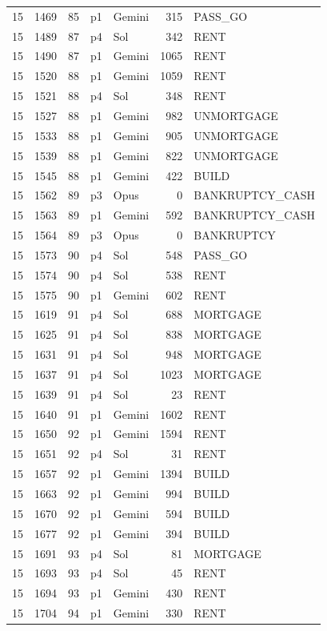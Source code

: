 \begin{longtable}{r r r l l r L{2.2in}}
15 & 1469 & 85 & p1 & Gemini & 315 & PASS\_GO \\
15 & 1489 & 87 & p4 & Sol & 342 & RENT \\
15 & 1490 & 87 & p1 & Gemini & 1065 & RENT \\
15 & 1520 & 88 & p1 & Gemini & 1059 & RENT \\
15 & 1521 & 88 & p4 & Sol & 348 & RENT \\
15 & 1527 & 88 & p1 & Gemini & 982 & UNMORTGAGE \\
15 & 1533 & 88 & p1 & Gemini & 905 & UNMORTGAGE \\
15 & 1539 & 88 & p1 & Gemini & 822 & UNMORTGAGE \\
15 & 1545 & 88 & p1 & Gemini & 422 & BUILD \\
15 & 1562 & 89 & p3 & Opus & 0 & BANKRUPTCY\_CASH \\
15 & 1563 & 89 & p1 & Gemini & 592 & BANKRUPTCY\_CASH \\
15 & 1564 & 89 & p3 & Opus & 0 & BANKRUPTCY \\
15 & 1573 & 90 & p4 & Sol & 548 & PASS\_GO \\
15 & 1574 & 90 & p4 & Sol & 538 & RENT \\
15 & 1575 & 90 & p1 & Gemini & 602 & RENT \\
15 & 1619 & 91 & p4 & Sol & 688 & MORTGAGE \\
15 & 1625 & 91 & p4 & Sol & 838 & MORTGAGE \\
15 & 1631 & 91 & p4 & Sol & 948 & MORTGAGE \\
15 & 1637 & 91 & p4 & Sol & 1023 & MORTGAGE \\
15 & 1639 & 91 & p4 & Sol & 23 & RENT \\
15 & 1640 & 91 & p1 & Gemini & 1602 & RENT \\
15 & 1650 & 92 & p1 & Gemini & 1594 & RENT \\
15 & 1651 & 92 & p4 & Sol & 31 & RENT \\
15 & 1657 & 92 & p1 & Gemini & 1394 & BUILD \\
15 & 1663 & 92 & p1 & Gemini & 994 & BUILD \\
15 & 1670 & 92 & p1 & Gemini & 594 & BUILD \\
15 & 1677 & 92 & p1 & Gemini & 394 & BUILD \\
15 & 1691 & 93 & p4 & Sol & 81 & MORTGAGE \\
15 & 1693 & 93 & p4 & Sol & 45 & RENT \\
15 & 1694 & 93 & p1 & Gemini & 430 & RENT \\
15 & 1704 & 94 & p1 & Gemini & 330 & RENT \\

\end{longtable}
